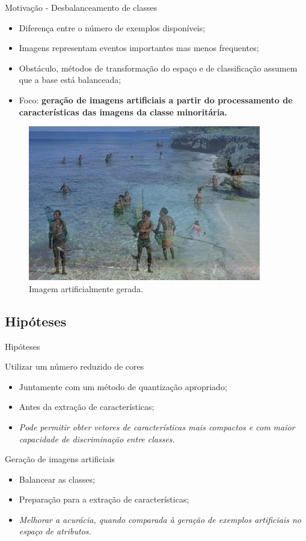 \documentclass{beamer}
\begin{document}
\begin{frame}{Motivação - Desbalanceamento de classes}
\setlength\leftmargini{0em}
\justifying
  \begin{itemize}
    \item Diferença entre o número de exemplos disponíveis;
    \item Imagens representam eventos importantes mas menos frequentes;
    \item Obstáculo, métodos de transformação do espaço e de
    classificação assumem que a base está balanceada;
    \item Foco: \textbf{geração de imagens artificiais a partir do processamento de características das imagens da classe minoritária.}
  \end{itemize}
  \begin{figure}[htbp]
 \begin{center}
   \includegraphics[width=.4\linewidth]{figuras/imagemgerada.jpg}
 \caption{Imagem artificialmente gerada.}
 \end{center}
\end{figure}

\end{frame}
\subsection{Hipóteses}
\setlength\leftmargini{1em}
\justifying
 \begin{frame}{Hipóteses}
  \begin{block}{Utilizar um número reduzido de cores}
    \justifying
    \begin{itemize}
      \item Juntamente com um método de quantização apropriado;
      \item Antes da extração de características;
      \item \textit{Pode permitir obter vetores de características mais compactos e com maior capacidade de discriminação entre classes.}
    \end{itemize}
  \end{block}
  \begin{block}{Geração de imagens artificiais}
    \justifying
    \begin{itemize}
      \item Balancear as classes;
      \item Preparação para a extração de características;
      \item \textit{Melhorar a acurácia, quando comparada à geração de exemplos artificiais no espaço de atributos.}
    \end{itemize}
  \end{block}
\end{frame}
\end{document}
